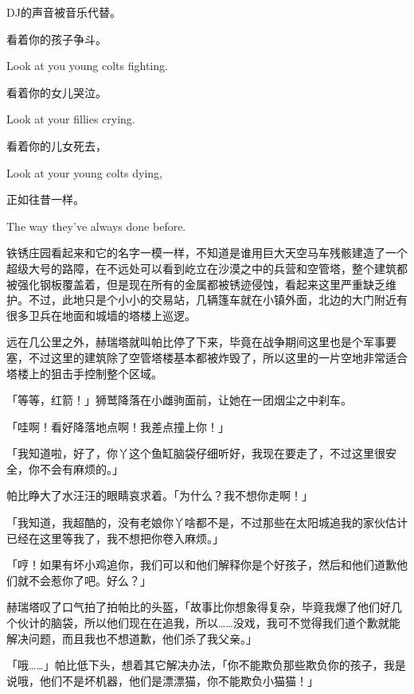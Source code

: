 DJ的声音被音乐代替。

\begin{song}
看着你的孩子争斗。

Look at you young colts fighting.

\medskip

看着你的女儿哭泣。

Look at your fillies crying.

\medskip

看着你的儿女死去，

Look at your young colts dying,

\medskip

正如往昔一样。

The way they've always done before.
\end{song}

\horizonline


铁锈庄园看起来和它的名字一模一样，不知道是谁用巨大天空马车残骸建造了一个超级大号的路障，在不远处可以看到屹立在沙漠之中的兵营和空管塔，整个建筑都被强化钢板覆盖着，但是现在所有的金属都被锈迹侵蚀，看起来这里严重缺乏维护。不过，此地只是个小小的交易站，几辆篷车就在小镇外面，北边的大门附近有很多卫兵在地面和城墙的塔楼上巡逻。

远在几公里之外，赫瑞塔就叫帕比停了下来，毕竟在战争期间这里也是个军事要塞，不过这里的建筑除了空管塔楼基本都被炸毁了，所以这里的一片空地非常适合塔楼上的狙击手控制整个区域。

「等等，红箭！」狮鹫降落在小雌驹面前，让她在一团烟尘之中刹车。

「哇啊！看好降落地点啊！我差点撞上你！」

「我知道啦，好了，你丫这个鱼缸脑袋仔细听好，我现在要走了，不过这里很安全，你不会有麻烦的。」

帕比睁大了水汪汪的眼睛哀求着。「为什么？我不想你走啊！」

「我知道，我超酷的，没有老娘你丫啥都不是，不过那些在太阳城追我的家伙估计已经在这里等我了，我不想把你卷入麻烦。」

「哼！如果有坏小鸡追你，我们可以和他们解释你是个好孩子，然后和他们道歉他们就不会惹你了吧。好么？」

赫瑞塔叹了口气拍了拍帕比的头盔，「故事比你想象得复杂，毕竟我爆了他们好几个伙计的脑袋，所以他们现在在追我，所以……没戏，我可不觉得我们道个歉就能解决问题，而且我也不想道歉，他们杀了我父亲。」

「哦……」帕比低下头，想着其它解决办法，「你不能欺负那些欺负你的孩子，我是说哦，他们不是坏机器，他们是漂漂猫，你不能欺负小猫猫！」

